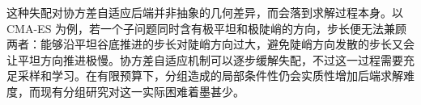 这种失配对协方差自适应后端并非抽象的几何差异，而会落到求解过程本身。以 CMA-ES 为例，若一个子问题同时含有极平坦和极陡峭的方向，步长便无法兼顾两者：能够沿平坦谷底推进的步长对陡峭方向过大，避免陡峭方向发散的步长又会让平坦方向推进极慢。协方差自适应机制可以逐步缓解失配，不过这一过程需要充足采样和学习。在有限预算下，分组造成的局部条件性仍会实质性增加后端求解难度，而现有分组研究对这一实际困难着墨甚少。